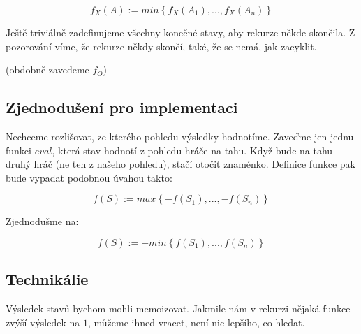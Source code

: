\documentclass[12pt]{article}
\begin{document}
\[
  f_X(A) := min\left\{ f_X(A_1),...,f_X(A_n) \right\}
\]

Ještě triviálně zadefinujeme všechny konečné stavy, aby rekurze někde skončila. Z pozorování víme,
že rekurze někdy skončí, také, že se nemá, jak zacyklit.

(obdobně zavedeme $f_O$)

\subsection{Zjednodušení pro implementaci}

Nechceme rozlišovat, ze kterého pohledu výsledky hodnotíme. Zaveďme jen jednu funkci $eval$, která stav hodnotí
z pohledu hráče na tahu. Když bude na tahu druhý hráč (ne ten z našeho pohledu), stačí otočit znaménko.
Definice funkce pak bude vypadat podobnou úvahou takto:

\[
  f(S) := max\left\{ -f(S_1),...,-f(S_n) \right\}
\]

Zjednodušme na:

\[
  f(S) := -min\left\{ f(S_1),...,f(S_n) \right\}
\]

\subsection{Technikálie}

Výsledek stavů bychom mohli memoizovat. Jakmile nám v rekurzi nějaká funkce zvýší výsledek na $1$, můžeme ihned vracet,
není nic lepšího, co hledat.
\end{document}
